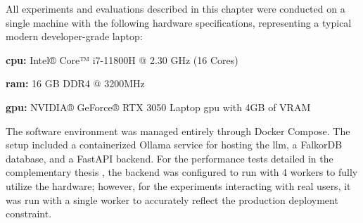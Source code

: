All experiments and evaluations described in this chapter were conducted on a single machine with the following hardware specifications, representing a typical modern developer-grade laptop:

\begin{compactitem}[\textbullet]
    \item \textbf{\acs{cpu}:} Intel® Core™ i7-11800H @ 2.30 GHz (16 Cores)
    \item \textbf{\acs{ram}:} 16 GB DDR4 @ 3200MHz
    \item \textbf{\acs{gpu}:} NVIDIA® GeForce® RTX 3050 Laptop \acs{gpu} with 4GB of VRAM
\end{compactitem}

The software environment was managed entirely through Docker Compose. The setup included a containerized Ollama service for hosting the \ac{llm}, a FalkorDB database, and a FastAPI backend. For the performance tests detailed in the complementary thesis \cite{MUII-THESIS}, the backend was configured to run with 4 workers to fully utilize the hardware; however, for the experiments interacting with real users, it was run with a single worker to accurately reflect the production deployment constraint.